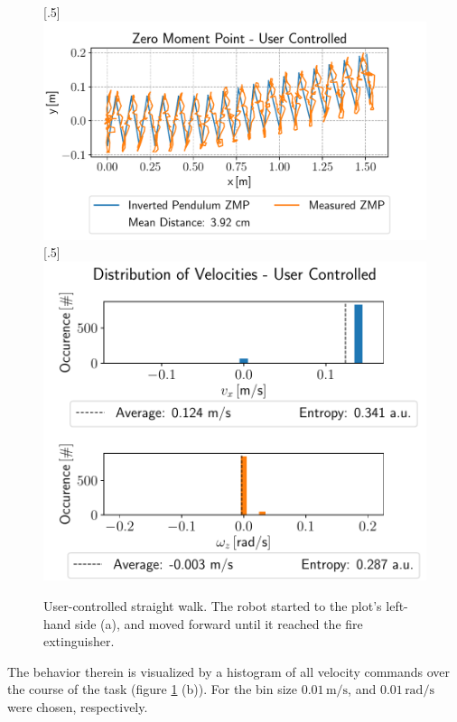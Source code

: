 \begin{figure}[h!]
	[.5\linewidth]{\includegraphics[scale=.45]{chapters/09_user_controlled_walking_experiments/img/02_test_environment/straight_walk_01_zmp.pdf}}
	[.5\linewidth]{\includegraphics[scale=.45]{chapters/09_user_controlled_walking_experiments/img/02_test_environment/straight_walk_01_entropy.pdf}}
	\caption{User-controlled straight walk. The robot started to the plot's left-hand side (a), and moved forward until it reached the fire extinguisher.}
	\label{fig::92_uc_straight}
\end{figure} 
The behavior therein is visualized by a histogram of all velocity commands over the course of the task (figure \ref{fig::92_uc_straight} (b)). For the bin size $0.01\,\text{m}/\text{s}$, and $0.01\,\text{rad}/\text{s}$ were chosen, respectively. 
